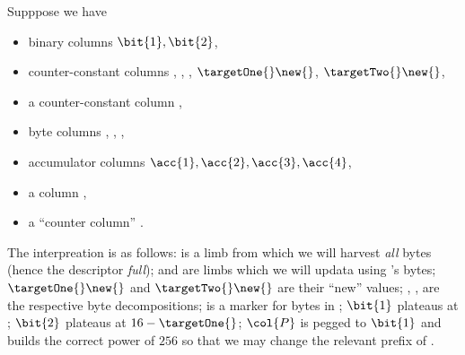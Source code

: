 Supppose we have
\begin{itemize}
	\item binary columns $\bit{1}, \bit{2}$,
	\item counter-constant columns  \source{}, \targetOne{}, \targetTwo{}, $\targetOne{}\new{}$, $\targetTwo{}\new{}$,
	\item a counter-constant column \targetOne{}\mark{},
	\item byte columns \source{}\byte{}, \targetOne{}\byte{}, \targetTwo{}\byte{},
	\item accumulator columns $\acc{1}, \acc{2}, \acc{3}, \acc{4}$,
	\item a column ,
	\item a ``counter column'' \ct{}.
\end{itemize}
The interpreation is as follows:
\source{} is a limb from which we will harvest \emph{all} bytes (hence the descriptor \emph{full});
\targetOne{} and \targetTwo{} are limbs which we will updata using \source{}'s bytes;
$\targetOne{}\new{}$ and $\targetTwo{}\new{}$ are their ``new'' values;
\source{}\byte{}, \targetOne{}\byte{}, \targetTwo{}\byte{} are the respective byte decompositions;
\targetOne{}\mark{} is a marker for bytes in \targetOne{};
$\bit{1}$ plateaus at \targetOne{}\mark{};
$\bit{2}$ plateaus at $16 - \targetOne{}\mark{}$;
$\col{P}$ is pegged to $\bit{1}$ and builds the correct power of $256$ so that we may change the relevant prefix of \targetTwo{}.

